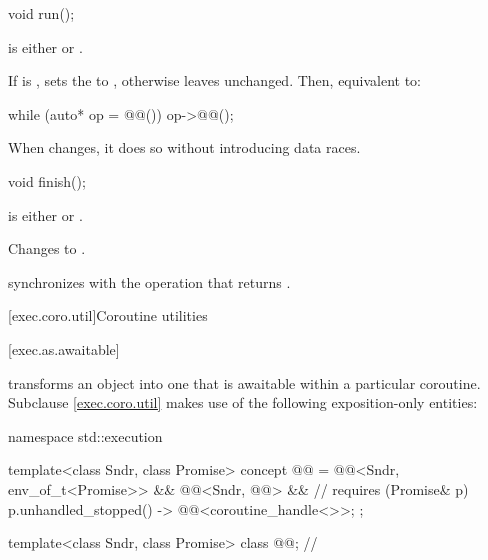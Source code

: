 %
\begin{itemdecl}
void run();
\end{itemdecl}

\begin{itemdescr}
\pnum
\expects
{} is either  or .

\pnum
\effects
If  is ,
sets the  to ,
otherwise leaves  unchanged.
Then, equivalent to:
\begin{codeblock}
while (auto* op = @@()) {
  op->@@();
}
\end{codeblock}

\pnum
\remarks
When  changes, it does so without introducing data races.
\end{itemdescr}

%
\begin{itemdecl}
void finish();
\end{itemdecl}

\begin{itemdescr}
\pnum
\expects
{} is either  or .

\pnum
\effects
Changes  to .

\pnum
\sync
{} synchronizes with the  operation
that returns .
\end{itemdescr}

[exec.coro.util]{Coroutine utilities}

[exec.as.awaitable]{}

\pnum
{} transforms an object into one
that is awaitable within a particular coroutine.
Subclause \ref{exec.coro.util} makes use of
the following exposition-only entities:
\begin{codeblock}
namespace std::execution {
  template<class Sndr, class Promise>
    concept @@ =
      @@<Sndr, env_of_t<Promise>> &&
      @@<Sndr, @@> &&    // \seebelow
      requires (Promise& p) {
        { p.unhandled_stopped() } -> @@<coroutine_handle<>>;
      };

  template<class Sndr, class Promise>
    class @@;                                     // \expos
}
\end{codeblock}

